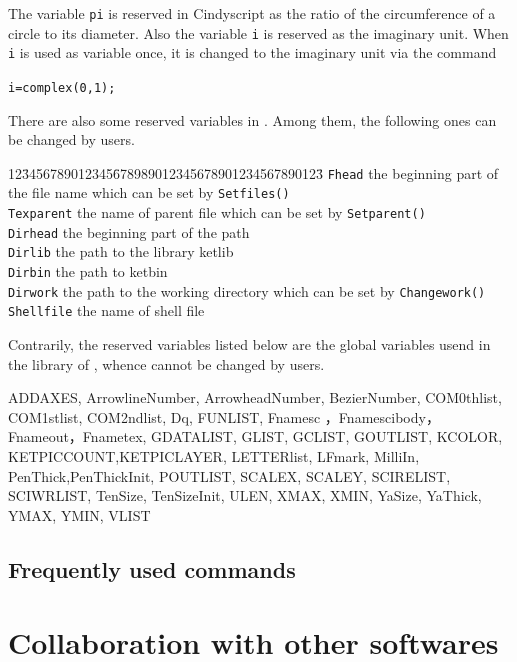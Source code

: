 \documentclass[papersize,a4paper,12pt]{article}
\begin{document}
The variable \verb|pi| is reserved in Cindyscript 
as the ratio of the circumference of a circle to its diameter. 
Also the variable \verb|i| is reserved 
as the imaginary unit. 
When \verb|i| is used as variable once, 
it is changed to the imaginary unit via the command 
\begin{center}
\verb|i=complex(0,1);|
\end{center}

There are also some reserved variables in \ketcindy . 
Among them, the following ones can be changed by users. 
\begin{tabbing}
12\=3456789012345\=678989012345678901234567890123\=\kill
\>\verb|Fhead|  \>the beginning part of the file name 
which can be set by  \verb|Setfiles()|\\
\>\verb|Texparent|  \>the name of parent file 
which can be set by \verb|Setparent()|\\
\>\verb|Dirhead|  \>the beginning part of the path\\
\>\verb|Dirlib|  \>the path to the library ketlib\\
\>\verb|Dirbin|  \>the path to ketbin\\
\>\verb|Dirwork|  \>the path to the working directory 
which can be set by \verb|Changework()|\\
\>\verb|Shellfile|  \>the name of shell file
\end{tabbing}
Contrarily, the reserved variables listed below are the global variables 
usend in the library of \ketcindy , whence cannot be changed 
by users. 

\vspace{\baselineskip}
\noindent 
ADDAXES, ArrowlineNumber, ArrowheadNumber, BezierNumber, COM0thlist, COM1stlist, COM2ndlist, Dq, FUNLIST, Fnamesc ，Fnamescibody，Fnameout，Fnametex, GDATALIST, GLIST, GCLIST, GOUTLIST, KCOLOR, KETPICCOUNT,KETPICLAYER, LETTERlist, LFmark, MilliIn, PenThick,PenThickInit,  POUTLIST, SCALEX, SCALEY, SCIRELIST, SCIWRLIST, TenSize, TenSizeInit, ULEN, XMAX, XMIN, YaSize, YaThick,   YMAX, YMIN, VLIST

\subsection{Frequently used commands}


\newpage

\section{Collaboration with other softwares}
\end{document}
